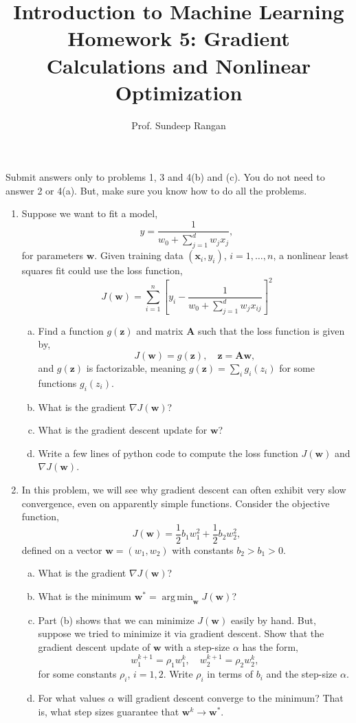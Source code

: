\documentclass[11pt]{article}
\def\argmin{\mathop{\mathrm{arg\,min}}}
\def\arr{\rightarrow}
\newcommand{\wbf}{\mathbf{w}}
\newcommand{\xbf}{\mathbf{x}}
\newcommand{\zbf}{\mathbf{z}}
\newcommand{\Abf}{\mathbf{A}}
\begin{document}
\title{Introduction to Machine Learning\\
Homework 5:  Gradient Calculations and Nonlinear Optimization}
\author{Prof. Sundeep Rangan}
\date{}

\maketitle

Submit answers only to problems 1, 3 and 4(b) and (c).  You do not need to answer 2 or 4(a).
But, make sure you know how to do all the problems.

\begin{enumerate}

\item Suppose we want to fit a model,
\[
    \hat{y} = \frac{1}{w_0 + \sum_{j=1}^d w_jx_j},
\]
for parameters $\wbf$. Given training data $(\xbf_i,y_i)$, $i=1,\ldots,n$,
a nonlinear least squares fit could use the loss function,
\[
    J(\wbf) = \sum_{i=1}^n \left[y_i -
        \frac{1}{w_0 + \sum_{j=1}^d w_jx_{ij}}\right]^2
\]
\begin{enumerate}[(a)]
\item Find a function $g(\zbf)$ and matrix $\Abf$ such that
the loss function is given by,
\[
    J(\wbf) = g(\zbf), \quad \zbf = \Abf\wbf,
\]
and $g(\zbf)$ is factorizable, meaning $g(\zbf) = \sum_i g_i(z_i)$ for
some functions $g_i(z_i)$.

\item What is the gradient $\nabla J(\wbf)$?

\item What is the gradient descent update for $\wbf$?

\item Write a few lines of python code to compute the loss function $J(\wbf)$ and
$\nabla J(\wbf)$.
\end{enumerate}

\item In this problem, we will see why gradient descent can often exhibit
very slow convergence, even on apparently simple functions.
Consider the objective function,
\[
    J(\wbf) = \frac{1}{2}b_1w_1^2 + \frac{1}{2}b_2w_2^2,
\]
defined on a vector $\wbf=(w_1,w_2)$ with constants $b_2 > b_1 > 0$.
\begin{enumerate}[(a)]
  \item What is the gradient $\nabla J(\wbf)$?
  \item What is the minimum $\wbf^* = \argmin_{\wbf} J(\wbf)$?
  \item Part (b) shows that we can minimize $J(\wbf)$ easily by hand.
  But, suppose we tried to minimize it via gradient descent.
  Show that the gradient descent update of $\wbf$ with a step-size $\alpha$
has the form,
\[
    w_1^{k+1} = \rho_1 w_1^k, \quad w_2^{k+1} = \rho_2 w_2^k,
\]
for some constants $\rho_i$, $i=1,2$.  Write $\rho_i$ in terms of
$b_i$ and the step-size $\alpha$.
  \item For what values $\alpha$ will gradient descent converge to the minimum? That is, what step sizes guarantee that $\wbf^k \arr \wbf^*$.


\end{enumerate}
\end{enumerate}
\end{document}
